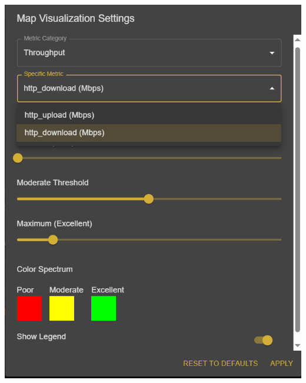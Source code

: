 \begin{itemize}
\begin{center}
    \end{center}
    \begin{center}
        \includegraphics[width=\textwidth]{images/setting_throughput_metrics.png}
    \end{center}
    \begin{center}

\end{center}
\end{itemize}

